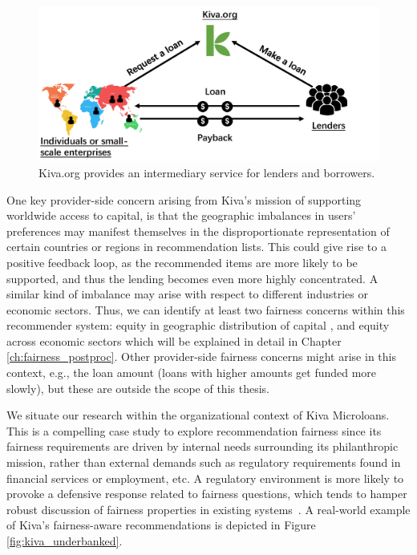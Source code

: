     \begin{figure}[htb]
    \includegraphics[width=0.98\columnwidth]{imgs/far/microlending.png}
    \caption{Kiva.org provides an intermediary service for lenders and borrowers.}
    \label{fig:kiva_process}
    \end{figure}
    
    
    One key provider-side concern arising from Kiva's mission of supporting worldwide access to capital, is that the geographic imbalances in users' preferences may manifest themselves in the disproportionate representation of certain countries or regions in recommendation lists. This could give rise to a positive feedback loop, as the recommended items are more likely to be supported, and thus the lending becomes even more highly concentrated. A similar kind of imbalance may arise with respect to different industries or economic sectors. Thus, we can identify at least two fairness concerns within this recommender system: equity in geographic distribution of capital \cite{liu2019personalized}, and equity across economic sectors \cite{sonboli2020opportunistic} which will be explained in detail in Chapter \ref{ch:fairness_postproc}. Other provider-side fairness concerns might arise in this context, e.g., the loan amount (loans with higher amounts get funded more slowly), but these are outside the scope of this thesis.
    
    We situate our research within the organizational context of Kiva Microloans. This is a compelling case study to explore recommendation fairness since its fairness requirements are driven by internal needs surrounding its philanthropic mission, rather than external demands such as regulatory requirements found in financial services or employment, etc. A regulatory environment is more likely to provoke a defensive response related to fairness questions, which tends to hamper robust discussion of fairness properties in existing systems~\cite{chen2018fair,holstein2019improving}. A real-world example of Kiva's fairness-aware recommendations is depicted in Figure \ref{fig:kiva_underbanked}.
    
